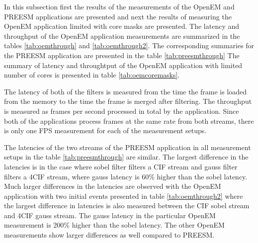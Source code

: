 
In this subsection first the results of the measurements of the OpenEM and PREESM applications are presented and next the results of measuring the OpenEM application limited with core masks are presented. The latency and throughput of the OpenEM application measurements are summarized in the tables \ref{tab:oemthrough} and \ref{tab:oemthrough2}. The corresponding summaries for the PREESM application are presented in the table \ref{tab:preesmthrough} The summary of latency and throughtput of the OpenEM application with limited number of cores is presented in table \ref{tab:oemcoremasks}.

The latency of both of the filters is measured from the time the frame is loaded from the memory to the time the frame is merged after filtering. The throughput is measured as frames per second processed in total by the application. Since both of the applications process frames at the same rate from both streams, there is only one FPS measurement for each of the measurement setups. 

The latencies of the two streams of the PREESM application in all measurement setups in the table \ref{tab:preesmthrough} are similar. The largest difference in the latencies is in the case where sobel filter filters a CIF stream and gauss filter filters a 4CIF stream, where gauss latency is 60\% higher than the sobel latency. Much larger differences in the latencies are observed with the OpenEM application with two initial events presented in table \ref{tab:oemthrough2} where the largest difference in latencies is also measured between the CIF sobel stream and 4CIF gauss stream. The gauss latency in the particular OpenEM measurement is 200\% higher than the sobel latency. The other OpenEM measurements show larger differences as well compared to PREESM.

